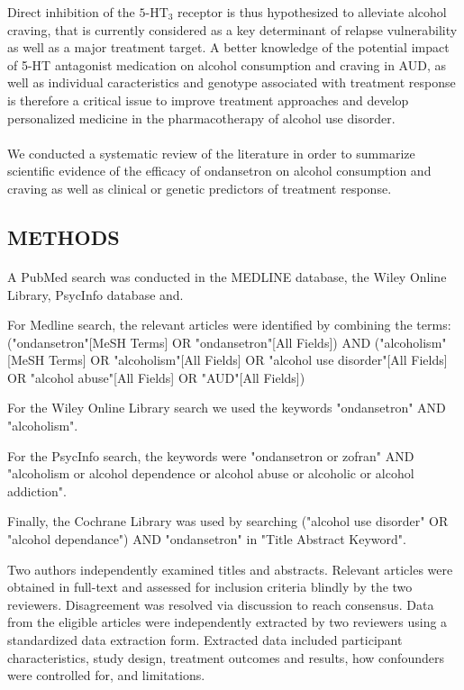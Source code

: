 Direct inhibition of the $\text{5-HT}_3$ receptor is thus hypothesized to alleviate alcohol craving, that is currently considered as a key determinant of relapse vulnerability as well as a major treatment target. A better knowledge of the potential impact of 5-HT antagonist medication on alcohol consumption and craving in AUD, as well as individual caracteristics and genotype associated with treatment response is therefore a critical issue to improve treatment approaches and develop personalized medicine in the pharmacotherapy of alcohol use disorder.
\paragraph{}
We conducted a systematic review of the literature in order to summarize scientific evidence of the efficacy of ondansetron on alcohol consumption and craving as well as clinical or genetic predictors of treatment response.

\subsection{METHODS}
\paragraph{}
A PubMed search was conducted in the MEDLINE database, the Wiley Online Library, PsycInfo database and.

For Medline search, the relevant articles were identified by combining the terms:
("ondansetron"[MeSH Terms] OR "ondansetron"[All Fields]) AND ("alcoholism"[MeSH Terms] OR "alcoholism"[All Fields] OR "alcohol use disorder"[All Fields] OR "alcohol abuse"[All Fields] OR "AUD"[All Fields])

For the Wiley Online Library search we used the keywords "ondansetron" AND "alcoholism".

For the PsycInfo search, the keywords were "ondansetron or zofran" AND "alcoholism or alcohol dependence or alcohol abuse or alcoholic or alcohol addiction".

Finally, the Cochrane Library was used by searching ("alcohol use disorder" OR "alcohol dependance") AND "ondansetron" in "Title Abstract Keyword".

Two authors independently examined titles and abstracts. Relevant articles were obtained in full-text and assessed for inclusion criteria blindly by the two reviewers. Disagreement was resolved via discussion to reach consensus. Data from the eligible articles were independently extracted by two reviewers using a standardized data extraction form. Extracted data included participant characteristics, study design, treatment outcomes and results, how confounders were controlled for, and limitations.  
